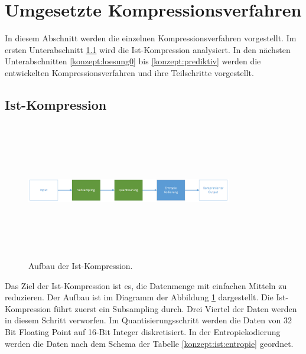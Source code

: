 \section{Umgesetzte Kompressionsverfahren} \label{konzept}
In diesem Abschnitt werden die einzelnen Kompressionsverfahren vorgestellt. Im ersten Unterabschnitt \ref{konzept:ist-komprimierung} wird die Ist-Kompression analysiert. In den nächsten Unterabschnitten \ref{konzept:loesung0} bis \ref{konzept:prediktiv} werden die entwickelten Kompressionsverfahren und ihre Teilschritte vorgestellt.

\subsection{Ist-Kompression} \label{konzept:ist-komprimierung}
\begin{figure}[!htbp]
	\center
	\includegraphics[width=0.8\textwidth,height=6cm,keepaspectratio]{./pictures/konzept/ist/aufbau.png}
	\caption{Aufbau der Ist-Kompression.}
	\label{konzept:ist:aufbau:diagramm}
\end{figure}
Das Ziel der Ist-Kompression ist es, die Datenmenge mit einfachen Mitteln zu reduzieren. Der Aufbau ist im Diagramm der Abbildung \ref{konzept:ist:aufbau:diagramm} dargestellt. Die Ist-Kompression führt zuerst ein Subsampling durch. Drei Viertel der Daten werden in diesem Schritt verworfen. Im Quantisierungsschritt werden die Daten von 32 Bit Floating Point auf 16-Bit Integer diskretisiert. In der Entropiekodierung werden die Daten nach dem Schema der Tabelle \ref{konzept:ist:entropie} geordnet.

